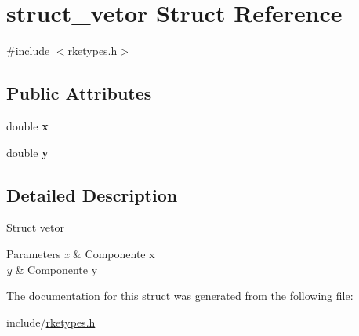 \hypertarget{structstruct__vetor}{\section{struct\-\_\-vetor Struct Reference}
\label{structstruct__vetor}
}


{\ttfamily \#include $<$rketypes.\-h$>$}

\subsection*{Public Attributes}
\begin{DoxyCompactItemize}
\item 
\hypertarget{structstruct__vetor_aae7646e904a8ce82b9c179ee26a0cc76}{double {\bfseries x}}\label{structstruct__vetor_aae7646e904a8ce82b9c179ee26a0cc76}

\item 
\hypertarget{structstruct__vetor_a73fafc2561b7eb18209e5ee4f6837b28}{double {\bfseries y}}\label{structstruct__vetor_a73fafc2561b7eb18209e5ee4f6837b28}

\end{DoxyCompactItemize}


\subsection{Detailed Description}
Struct vetor 
\begin{DoxyParams}{Parameters}
{\em x} & Componente x \\
\hline
{\em y} & Componente y \\
\hline
\end{DoxyParams}


The documentation for this struct was generated from the following file\-:\begin{DoxyCompactItemize}
\item 
include/\hyperlink{rketypes_8h}{rketypes.\-h}\end{DoxyCompactItemize}
